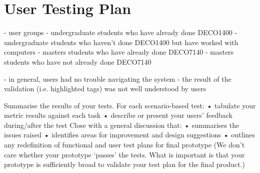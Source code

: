 \documentclass[10pt]{article}
\begin{document}
\newpage

\section*{User Testing Plan}

- user groups
  - undergraduate students who have already done DECO1400
  - undergraduate students who haven't done DECO1400 but have worked with computers
  - masters students who have already done DECO7140
  - masters students who have not already done DECO7140

- in general, users had no trouble navigating the system
- the result of the validation (i.e. highlighted tags) was not well understood by users

Summarise the results of your tests. 
For each scenario-based test: 
• tabulate your metric results against each task 
• describe or present your users’ feedback during/after the test 
Close with a general discussion that: 
• summarises the issues raised 
• identifies areas for improvement and design suggestions 
• outlines any redefinition of functional and user test plans for final 
prototype 
(We don’t care whether your prototype ‘passes’ the tests. What is 
important is that your prototype is sufficiently broad to validate your test 
plan for the final product.)
\end{document}
